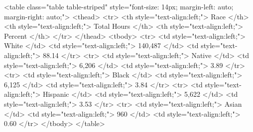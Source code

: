 \documentclass[border=1mm, preview]{standalone}
\begin{document}
<table class="table table-striped" style="font-size: 14px; margin-left: auto; margin-right: auto;">
 <thead>
  <tr>
   <th style="text-align:left;"> Race </th>
   <th style="text-align:left;"> Total Hours </th>
   <th style="text-align:left;"> Percent </th>
  </tr>
 </thead>
<tbody>
  <tr>
   <td style="text-align:left;"> White </td>
   <td style="text-align:left;"> 140,487 </td>
   <td style="text-align:left;"> 88.14%
  </tr>
  <tr>
   <td style="text-align:left;"> Native </td>
   <td style="text-align:left;"> 6,206 </td>
   <td style="text-align:left;"> 3.89%
  </tr>
  <tr>
   <td style="text-align:left;"> Black </td>
   <td style="text-align:left;"> 6,125 </td>
   <td style="text-align:left;"> 3.84%
  </tr>
  <tr>
   <td style="text-align:left;"> Hispanic </td>
   <td style="text-align:left;"> 5,622 </td>
   <td style="text-align:left;"> 3.53%
  </tr>
  <tr>
   <td style="text-align:left;"> Asian </td>
   <td style="text-align:left;"> 960 </td>
   <td style="text-align:left;"> 0.60%
  </tr>
</tbody>
</table>
\end{document}
